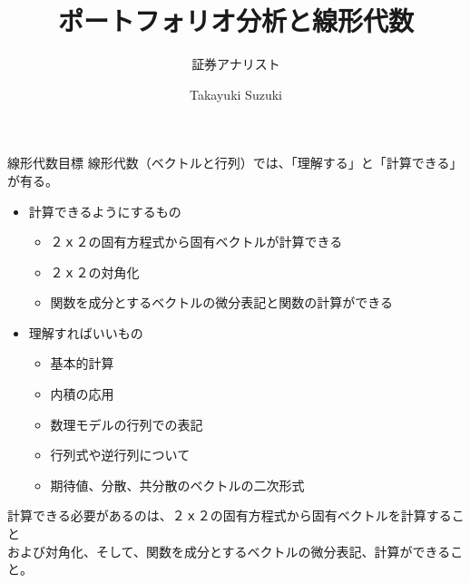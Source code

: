 \documentclass[dvipdfmx,autodetect-engine, unicode, 10pt, aspectratio=169]{beamer}
\title{ポートフォリオ分析と線形代数}
\subtitle{証券アナリスト}
\date{}
\author{Takayuki Suzuki}
\institute{This is institude of the author}
\begin{document}
\maketitle


\begin{frame}{線形代数目標}
    線形代数（ベクトルと行列）では、「理解する」と「計算できる」が有る。 
    \begin{itemize}
        \item 計算できるようにするもの
        \begin{itemize}
            \item ２ｘ２の固有方程式から固有ベクトルが計算できる
            \item ２ｘ２の対角化
            \item 関数を成分とするベクトルの微分表記と関数の計算ができる
        \end{itemize}
        \item 理解すればいいもの
        \begin{itemize}
            \item 基本的計算
            \item 内積の応用
            \item 数理モデルの行列での表記
            \item 行列式や逆行列について
            \item 期待値、分散、共分散のベクトルの二次形式
        \end{itemize}
    \end{itemize}
    計算できる必要があるのは、２ｘ２の固有方程式から固有ベクトルを計算すること \\
    および対角化、そして、関数を成分とするベクトルの微分表記、計算ができること。 \\
    
\end{frame}
\end{document}
